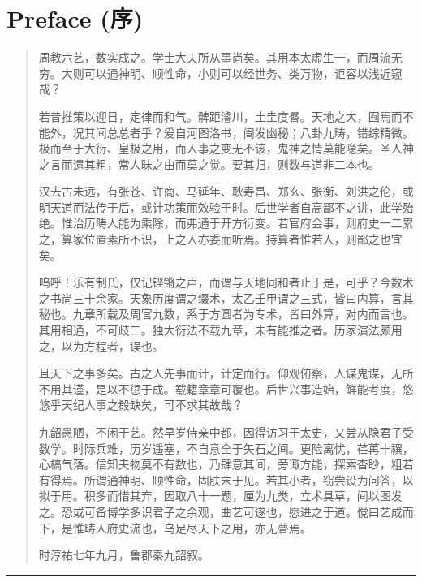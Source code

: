 \documentclass[11pt,a4paper]{article}
\newenvironment{preface}{%
  \begin{quote}\color{prefacecolor}%
}{\end{quote}}
\newcommand{\zhtext}[1]{{\chinese #1}}
\begin{document}
\newpage

\section{Preface (\zhtext{序})}

\begin{preface}
周教六艺，数实成之。学士大夫所从事尚矣。其用本太虚生一，而周流无穷。大则可以通神明、顺性命，小则可以经世务、类万物，讵容以浅近窥哉？

若昔推策以迎日，定律而和气。髀距濬川，土圭度晷。天地之大，囿焉而不能外，况其间总总者乎？爰自河图洛书，闿发幽秘；八卦九畴，错综精微。极而至于大衍、皇极之用，而人事之变无不该，鬼神之情莫能隐矣。圣人神之言而遗其粗，常人昧之由而莫之觉。要其归，则数与道非二本也。

汉去古未远，有张苍、许商、马延年、耿寿昌、郑玄、张衡、刘洪之伦，或明天道而法传于后，或计功策而效验于时。后世学者自高鄙不之讲，此学殆绝。惟治历畴人能为乘除，而弗通于开方衍变。若官府会事，则府史一二累之，算家位置素所不识，上之人亦委而听焉。持算者惟若人，则鄙之也宜矣。

呜呼！乐有制氏，仅记铿锵之声，而谓与天地同和者止于是，可乎？今数术之书尚三十余家。天象历度谓之缀术，太乙壬甲谓之三式，皆曰内算，言其秘也。九章所载及周官九数，系于方圆者为专术，皆曰外算，对内而言也。其用相通，不可歧二。独大衍法不载九章，未有能推之者。历家演法颇用之，以为方程者，误也。

且天下之事多矣。古之人先事而计，计定而行。仰观俯察，人谋鬼谋，无所不用其谨，是以不愆于成。载籍章章可覆也。后世兴事造始，鲜能考度，悠悠乎天纪人事之殽缺矣，可不求其故哉？

九韶愚陋，不闲于艺。然早岁侍亲中都，因得访习于太史，又尝从隐君子受数学。时际兵难，历岁遥塞，不自意全于矢石之间。更险离忧，荏苒十禩，心槁气落。信知夫物莫不有数也，乃肆意其间，旁诹方能，探索杳眇，粗若有得焉。所谓通神明、顺性命，固肤末于见。若其小者，窃尝设为问答，以拟于用。积多而惜其弃，因取八十一题，厘为九类，立术具草，间以图发之。恐或可备博学多识君子之余观，曲艺可遂也，愿进之于道。傥曰艺成而下，是惟畴人府史流也，乌足尽天下之用，亦无瞢焉。

时淳祐七年九月，鲁郡秦九韶叙。
\end{preface}

\vspace{1em}
\noindent\textcolor{rulecolor}{\rule{\textwidth}{0.4pt}}
\vspace{0.5em}
\end{document}
